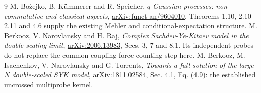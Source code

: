 \documentclass[11pt,a4paper]{article}
\begin{document}
\begin{thebibliography}{9}\small
{} M. Bo\.{z}ejko, B. K\"ummerer and R. Speicher,
\emph{$q$-Gaussian processes: non-commutative and classical aspects},
\href{https://arxiv.org/abs/funct-an/9604010}{arXiv:funct-an/9604010}.
Theorems 1.10, 2.10--2.11 and 4.6 supply the existing Mehler and
conditional-expectation structure.
 M. Berkooz, V. Narovlansky and H. Raj,
\emph{Complex Sachdev-Ye-Kitaev model in the double scaling limit},
\href{https://arxiv.org/abs/2006.13983}{arXiv:2006.13983},
Secs. 3, 7 and 8.1. Its independent probes do not replace the
common-coupling force-counting step here.
 M. Berkooz, M. Isachenkov, V. Narovlansky and G. Torrents,
\emph{Towards a full solution of the large N double-scaled SYK model},
\href{https://arxiv.org/abs/1811.02584}{arXiv:1811.02584},
Sec. 4.1, Eq. (4.9): the established uncrossed multiprobe kernel.
\end{thebibliography}
\end{document}
